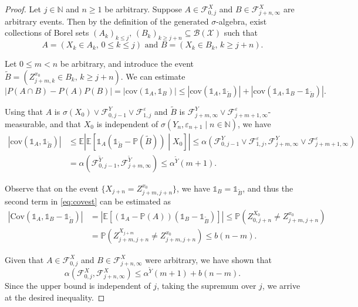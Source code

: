 \documentclass[a4paper,10pt]{article}
\newcommand{\N}{\mathbb{N}}
\newcommand{\B}{\mathcal{B}}
\newcommand{\F}{\mathcal{F}}
\newcommand{\X}{\mathcal{X}}
\renewcommand{\P}{\mathbb{P}}
\newcommand{\E}{\mathbb{E}}
\newcommand{\ind}{\mathds{1}}
\newcommand{\eps}{\varepsilon}
\newcommand{\cov}{\mathrm{Cov}}
\begin{document}
\begin{proof}

Let $j \in \N$ and $n \ge 1$ be arbitrary. Suppose $A \in \F_{0,j}^{X}$ and $B \in \F_{j+n, \infty}^{X}$ are arbitrary events. Then by the definition of the generated $\sigma$-algebra, exist collections of Borel sets
$
(A_k)_{k\le j},\,(B_k)_{k\ge j+n}\subseteq\B (\X)
$
such that		
$$
A=(X_k\in A_k,\,0\le k\le j)
\,\,\text{and}\,\,
B=(X_k\in B_k,\,k\ge j+n).
$$

Let \( 0 \le m < n \) be arbitrary, and introduce the event
$
\tilde{B} = \left( Z_{j+m,k}^{x_0} \in B_k, \, k \ge j+n \right).
$
We can estimate
\begin{equation}\label{eq:covest}
	|P(A \cap B) - P(A)P(B)| = |\text{cov}(\ind_A, \ind_B)| 
	\le 
	|\text{cov}(\ind_A, \ind_{\tilde{B}})| + 
	|\text{cov}(\ind_A, \ind_B - \ind_{\tilde{B}})|.
\end{equation}

Using that $A$ is $\sigma (X_0)\vee\F_{0,j-1}^Y\vee\F_{1,j}^\eps$ and $\tilde{B}$ is $\F_{j+m,\infty}^Y\vee\F_{j+m+1,\infty}^\eps$-measurable, and that $X_0$ is independent of $\sigma (Y_n,\eps_{n+1}\mid n\in\N)$, we have
\begin{align*}
	|\text{cov}(\ind_A, \ind_{\tilde{B}})| 
	&\le 
	\E\left| 
	\E \left[\ind_{A}(\ind_{\tilde{B}}-\P(\tilde{B}))
	\middle|X_0
	\right]
	\right|
	\le 
	\alpha (\F_{0,j-1}^Y\vee\F_{1,j}^\eps,\F_{j+m,\infty}^Y\vee\F_{j+m+1,\infty}^\eps)
	\\
	&=\alpha (\F_{0,j-1}^{\tilde{Y}},\F_{j+m,\infty}^{\tilde{Y}})
	\le  \alpha^{\tilde{Y}} (m+1).
\end{align*}

Observe that on the event $\{X_{j+n}=Z_{j+m, j+n}^{x_0}\}$, we have $\ind_{B} = \ind_{\tilde{B}}$, and thus the second term in \eqref{eq:covest} can be estimated as	
\begin{align*}
|\cov(\ind_{A},\ind_{B}-\ind_{\tilde{B}})|
&=
\left|\E [(\ind_{A}-\P (A))(\ind_{B}-\ind_{\tilde{B}})]\right|
\le
\P \left(Z_{0, j+n}^{X_{0}}\ne Z_{j+m, j+n}^{x_0}\right)
\\
&=\P \left(Z_{j+m, j+n}^{X_{j+m}}\ne Z_{j+m, j+n}^{x_0}\right)
\le b(n-m).
\end{align*}	

Given that $A\in\F_{0,j}^{X}$ and $B\in\F_{j+n,\infty}^{X}$ were arbitrary, we have shown that 
$$
\alpha (\F_{0,j}^{X},\F_{j+n,\infty}^{X})
\le
\alpha^{\tilde{Y}} (m+1)
+ b(n-m).
$$
Since the upper bound is independent of \( j \), taking the supremum over \( j \), we arrive at the desired inequality.
\end{proof}
\end{document}

